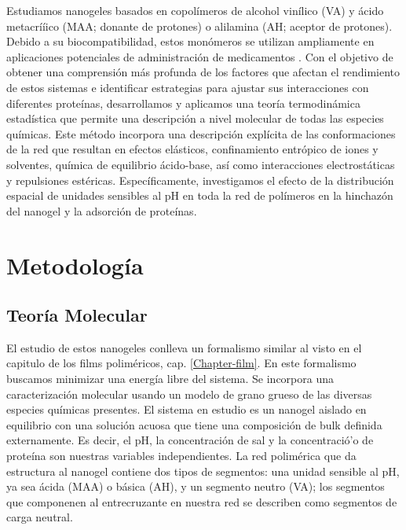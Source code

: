 Estudiamos nanogeles basados en copol\'imeros de alcohol vin\'ilico (VA) y \'acido metacrí\'iico (MAA; donante de protones) o alilamina (AH; aceptor de protones).
Debido a su biocompatibilidad, estos mon\'omeros se utilizan ampliamente en aplicaciones potenciales de administraci\'on de medicamentos \cite{asadi2020common,sarwar2020smart,lowman1999oral}.
Con el objetivo de obtener una comprensi\'on m\'as profunda de los factores que afectan el rendimiento de estos sistemas e identificar estrategias para ajustar sus interacciones con diferentes prote\'inas, desarrollamos y aplicamos una teor\'ia termodin\'amica estad\'istica que permite una descripci\'on a nivel molecular de todas las especies qu\'imicas.
Este m\'etodo incorpora una descripci\'on expl\'icita de las conformaciones de la red que resultan en efectos el\'asticos, confinamiento entr\'opico de iones y solventes, qu\'imica de equilibrio \'acido-base, as\'i como interacciones electrost\'aticas y repulsiones est\'ericas.
Espec\'ificamente, investigamos el efecto de la distribuci\'on espacial de unidades sensibles al pH en toda la red de pol\'imeros en la hinchaz\'on del nanogel y la adsorci\'on de prote\'inas.



\section{Metodolog\'ia}
\subsection{Teor\'ia Molecular}
El estudio de estos nanogeles conlleva un formalismo similar al visto en el capitulo de los films polim\'ericos, cap. \ref{Chapter-film}.
En este formalismo  buscamos minimizar una energ\'ia libre del sistema. Se incorpora una caracterizaci\'on molecular usando un modelo de grano grueso de las diversas especies qu\'imicas presentes.
El sistema en estudio es un nanogel aislado en equilibrio con una soluci\'on acuosa que tiene una composici\'on de bulk definida externamente.
Es decir, el pH, la concentraci\'on de sal y la concentració'o de prote\'ina son nuestras variables independientes.
La red polim\'erica que da estructura al nanogel contiene dos tipos de segmentos: una unidad sensible al pH, ya sea \'acida (MAA) o b\'asica (AH), y un segmento neutro (VA);
los segmentos que componenen al entrecruzante en nuestra red se describen como segmentos de carga neutral.

